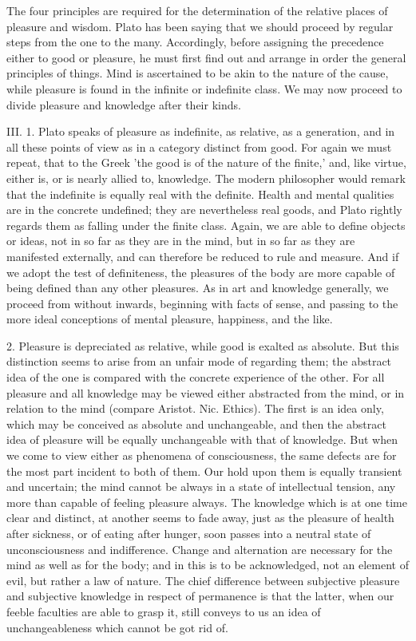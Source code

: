 \documentclass[11pt,letter]{article}
\begin{document}
\par  The four principles are required for the determination of the relative places of pleasure and wisdom. Plato has been saying that we should proceed by regular steps from the one to the many. Accordingly, before assigning the precedence either to good or pleasure, he must first find out and arrange in order the general principles of things. Mind is ascertained to be akin to the nature of the cause, while pleasure is found in the infinite or indefinite class. We may now proceed to divide pleasure and knowledge after their kinds.

\par  III. 1. Plato speaks of pleasure as indefinite, as relative, as a generation, and in all these points of view as in a category distinct from good. For again we must repeat, that to the Greek 'the good is of the nature of the finite,' and, like virtue, either is, or is nearly allied to, knowledge. The modern philosopher would remark that the indefinite is equally real with the definite. Health and mental qualities are in the concrete undefined; they are nevertheless real goods, and Plato rightly regards them as falling under the finite class. Again, we are able to define objects or ideas, not in so far as they are in the mind, but in so far as they are manifested externally, and can therefore be reduced to rule and measure. And if we adopt the test of definiteness, the pleasures of the body are more capable of being defined than any other pleasures. As in art and knowledge generally, we proceed from without inwards, beginning with facts of sense, and passing to the more ideal conceptions of mental pleasure, happiness, and the like.

\par  2. Pleasure is depreciated as relative, while good is exalted as absolute. But this distinction seems to arise from an unfair mode of regarding them; the abstract idea of the one is compared with the concrete experience of the other. For all pleasure and all knowledge may be viewed either abstracted from the mind, or in relation to the mind (compare Aristot. Nic. Ethics). The first is an idea only, which may be conceived as absolute and unchangeable, and then the abstract idea of pleasure will be equally unchangeable with that of knowledge. But when we come to view either as phenomena of consciousness, the same defects are for the most part incident to both of them. Our hold upon them is equally transient and uncertain; the mind cannot be always in a state of intellectual tension, any more than capable of feeling pleasure always. The knowledge which is at one time clear and distinct, at another seems to fade away, just as the pleasure of health after sickness, or of eating after hunger, soon passes into a neutral state of unconsciousness and indifference. Change and alternation are necessary for the mind as well as for the body; and in this is to be acknowledged, not an element of evil, but rather a law of nature. The chief difference between subjective pleasure and subjective knowledge in respect of permanence is that the latter, when our feeble faculties are able to grasp it, still conveys to us an idea of unchangeableness which cannot be got rid of.
\end{document}
